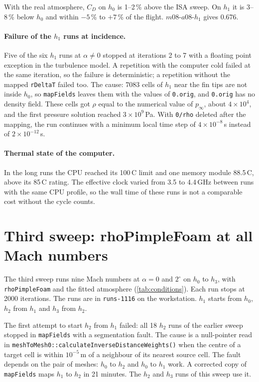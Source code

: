 \documentclass[11pt,a4paper]{article}
\newcommand{\unit}[2]{#1\,#2}
\begin{document}
With the real atmosphere, $C_D$ on $h_0$ is 1--2\,\% above the ISA sweep. On $h_1$ it is
3--8\,\% below $h_0$ and within $-5$\,\% to $+7$\,\% of the flight. $m08$-$a08$-$h_1$
gives 0.676.

\paragraph{Failure of the $h_1$ runs at incidence.} Five of the six $h_1$ runs at
$\alpha \neq 0$ stopped at iterations 2 to 7 with a floating point exception in the
turbulence model. A repetition with the computer cold failed at the same iteration, so
the failure is deterministic; a repetition without the mapped \texttt{rDeltaT} failed
too. The cause: 7083 cells of $h_1$ near the fin tips are not inside $h_0$, so
\texttt{mapFields} leaves them with the values of \texttt{0.orig}, and \texttt{0.orig}
has no density field. These cells got $\rho$ equal to the numerical value of
$p_\infty$, about $4\times10^4$, and the first pressure solution reached
$3\times10^9$\,Pa. With \texttt{0/rho} deleted after the mapping, the run continues with
a minimum local time step of $4\times10^{-8}$\,s instead of $2\times10^{-12}$\,s.

\paragraph{Thermal state of the computer.} In the long runs the CPU reached its
\unit{100}{\textdegree C} limit and one memory module \unit{88.5}{\textdegree C}, above
its \unit{85}{\textdegree C} rating. The effective clock varied from 3.5 to
\unit{4.4}{GHz} between runs with the same CPU profile, so the wall time of these runs
is not a comparable cost without the cycle counts.

\section{Third sweep: rhoPimpleFoam at all Mach numbers}\label{sec:sweep3}

The third sweep runs nine Mach numbers at $\alpha = 0$ and $2^\circ$ on $h_0$ to $h_3$,
with \texttt{rhoPimpleFoam} and the fitted atmosphere (\cref{tab:conditions}). Each run
stops at 2000 iterations. The runs are in \texttt{runs-1116} on the workstation.
$h_1$ starts from $h_0$, $h_2$ from $h_1$ and $h_3$ from $h_2$.

The first attempt to start $h_2$ from $h_1$ failed: all 18 $h_2$ runs of the earlier
sweep stopped in \texttt{mapFields} with a segmentation fault. The cause is a
null-pointer read in \texttt{meshToMesh0::calculateInverseDistanceWeights()} when the
centre of a target cell is within $10^{-5}$\,m of a neighbour of its nearest source
cell. The fault depends on the pair of meshes: $h_0$ to $h_2$ and $h_0$ to $h_1$ work.
A corrected copy of \texttt{mapFields} maps $h_1$ to $h_2$ in 21 minutes. The
$h_2$ and $h_3$ runs of this sweep use it.
\end{document}
